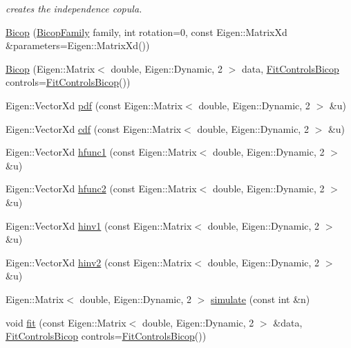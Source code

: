 \begin{DoxyCompactItemize}
\begin{DoxyCompactList}\small\item\em creates the independence copula. \end{DoxyCompactList}\item 
\hyperlink{classvinecopulib_1_1_bicop_ab27f789e001e30f2fed7f9ecefdeffb0}{Bicop} (\hyperlink{namespacevinecopulib_a42e95cc06d33896199caab0c11ad44f3}{Bicop\+Family} family, int rotation=0, const Eigen\+::\+Matrix\+Xd \&parameters=Eigen\+::\+Matrix\+Xd())
\item 
\hyperlink{classvinecopulib_1_1_bicop_afc8b465d9e02a3df1c25f7c1e7ac9240}{Bicop} (Eigen\+::\+Matrix$<$ double, Eigen\+::\+Dynamic, 2 $>$ data, \hyperlink{classvinecopulib_1_1_fit_controls_bicop}{Fit\+Controls\+Bicop} controls=\hyperlink{classvinecopulib_1_1_fit_controls_bicop}{Fit\+Controls\+Bicop}())
\item 
Eigen\+::\+Vector\+Xd \hyperlink{classvinecopulib_1_1_bicop_a83dc7214e4bb1bfe59285ca05407d646}{pdf} (const Eigen\+::\+Matrix$<$ double, Eigen\+::\+Dynamic, 2 $>$ \&u)
\item 
Eigen\+::\+Vector\+Xd \hyperlink{classvinecopulib_1_1_bicop_a153d7e766388066eda14577c5a6332cc}{cdf} (const Eigen\+::\+Matrix$<$ double, Eigen\+::\+Dynamic, 2 $>$ \&u)
\item 
Eigen\+::\+Vector\+Xd \hyperlink{classvinecopulib_1_1_bicop_a130fda62cd61c7acdef5db75fffdd89e}{hfunc1} (const Eigen\+::\+Matrix$<$ double, Eigen\+::\+Dynamic, 2 $>$ \&u)
\item 
Eigen\+::\+Vector\+Xd \hyperlink{classvinecopulib_1_1_bicop_a4c9b50f99797ec374f5057cc54db2bd8}{hfunc2} (const Eigen\+::\+Matrix$<$ double, Eigen\+::\+Dynamic, 2 $>$ \&u)
\item 
Eigen\+::\+Vector\+Xd \hyperlink{classvinecopulib_1_1_bicop_a3cc8b161ec6efdb3b34d2efa9185bf44}{hinv1} (const Eigen\+::\+Matrix$<$ double, Eigen\+::\+Dynamic, 2 $>$ \&u)
\item 
Eigen\+::\+Vector\+Xd \hyperlink{classvinecopulib_1_1_bicop_a3e33ec227b6b7182e327399201cad382}{hinv2} (const Eigen\+::\+Matrix$<$ double, Eigen\+::\+Dynamic, 2 $>$ \&u)
\item 
Eigen\+::\+Matrix$<$ double, Eigen\+::\+Dynamic, 2 $>$ \hyperlink{classvinecopulib_1_1_bicop_aeb87bea4283dacfa5e609356c020f85d}{simulate} (const int \&n)
\item 
void \hyperlink{classvinecopulib_1_1_bicop_a2d509a8b404a73ef17f04a0678e90a71}{fit} (const Eigen\+::\+Matrix$<$ double, Eigen\+::\+Dynamic, 2 $>$ \&data, \hyperlink{classvinecopulib_1_1_fit_controls_bicop}{Fit\+Controls\+Bicop} controls=\hyperlink{classvinecopulib_1_1_fit_controls_bicop}{Fit\+Controls\+Bicop}())

\end{DoxyCompactItemize}

